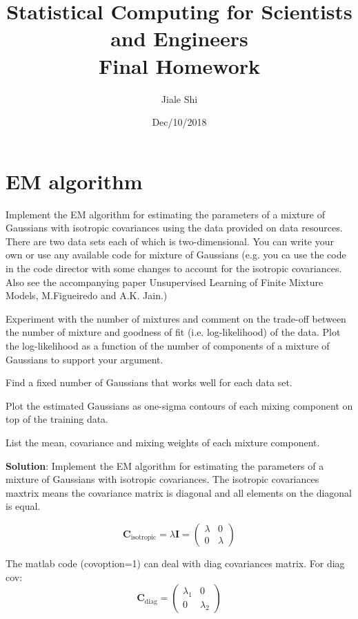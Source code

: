 \documentclass{article}
\title{Statistical Computing for Scientists and Engineers\\[1em] Final Homework}
\author{Jiale Shi}
\date{Dec/10/2018}
\begin{document}
\maketitle

\newpage
\section{EM algorithm}
Implement the EM algorithm for estimating the parameters of a mixture of Gaussians with isotropic covariances using the data provided on data resources. There are two data sets each of which is two-dimensional. You can write your own or use any available code for mixture of Gaussians (e.g. you ca use the code in the code director with some changes to account for the isotropic covariances. Also see the accompanying paper Unsupervised Learning of Finite Mixture Models, M.Figueiredo and A.K. Jain.)

Experiment with the number of mixtures and comment on the trade-off between the number of mixture and goodness of fit (i.e. log-likelihood) of the data. Plot the log-likelihood as a function of the number of components of a mixture of Gaussians to support your argument.

Find a fixed number of Gaussians that works well for each data set.

Plot the estimated Gaussians as one-sigma contours of each mixing component on top of the training data.

List the mean, covariance and mixing weights of each mixture component.

\textbf{Solution}:
Implement the EM algorithm for estimating the parameters of a mixture of Gaussians with isotropic covariances. The isotropic covariances maxtrix means the covariance matrix is diagonal and all elements on the diagonal is equal.

\begin{equation}
    \textbf{C}_{\mbox{isotropic}} = \lambda \textbf{I} = \left( \begin{array}{cc}  \lambda & 0 \\ 0 & \lambda
    \end{array} \right)
\end{equation}

The matlab code (covoption=1) can deal with diag covariances matrix. 
For diag cov:
\begin{equation}
    \textbf{C}_{\mbox{diag}} =  \left( \begin{array}{cc}  \lambda_1 & 0 \\ 0 & \lambda_2
    \end{array} \right)
\end{equation}
\end{document}
